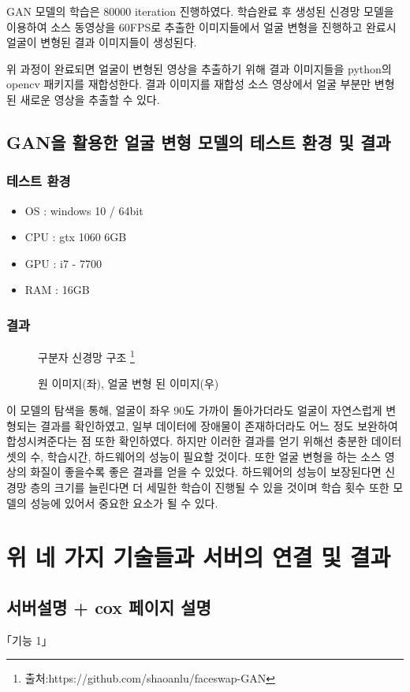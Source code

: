 \documentclass{oblivoir}
\newcommand{\spec}{
\begin{itemize}
    \item OS : windows 10 / 64bit
    \item CPU : gtx 1060 6GB
    \item GPU : i7 - 7700
    \item RAM : 16GB
\end{itemize}
}
\begin{document}
\begin{enumerate}
    GAN 모델의 학습은 80000 iteration 진행하였다. 학습완료 후 생성된 신경망 모델을 이용하여 소스 동영상을 60FPS로 추출한 이미지들에서 얼굴 변형을 진행하고 완료시 얼굴이 변형된 결과 이미지들이 생성된다.

    위 과정이 완료되면 얼굴이 변형된 영상을 추출하기 위해 결과 이미지들을 python의 opencv 패키지를 재합성한다. 결과 이미지를 재합성 소스 영상에서 얼굴 부분만 변형된 새로운 영상을 추출할 수 있다.

    \section{ GAN을 활용한 얼굴 변형 모델의 테스트 환경 및 결과}

    \subsection{테스트 환경}
    \spec
    \subsection{결과}

    \begin{figure}[h!]
    \centering
    \caption{구분자 신경망 구조 \protect\footnote{출처:https://github.com/shaoanlu/faceswap-GAN}}
    \end{figure}

    \begin{figure}[h!]
    \centering
    \caption{원 이미지(좌), 얼굴 변형 된 이미지(우)}
    \end{figure}


    이 모델의 탐색을 통해, 얼굴이 좌우 90도 가까이 돌아가더라도 얼굴이 자연스럽게 변형되는 결과를 확인하였고, 일부 데이터에 장애물이 존재하더라도 어느 정도 보완하여 합성시켜준다는 점 또한 확인하였다. 하지만 이러한 결과를 얻기 위해선 충분한 데이터 셋의 수, 학습시간, 하드웨어의 성능이 필요할 것이다. 또한 얼굴 변형을 하는 소스 영상의 화질이 좋을수록 좋은 결과를 얻을 수 있었다. 하드웨어의 성능이 보장된다면 신경망 층의 크기를 늘린다면 더 세밀한 학습이 진행될 수 있을 것이며 학습 횟수 또한 모델의 성능에 있어서 중요한 요소가 될 수 있다.

    \chapter{ 위 네 가지 기술들과 서버의 연결 및 결과  }

    \section{ 서버설명 + cox 페이지 설명}

    \begin{figure}[h!]
    \centering
    \end{figure}

    \begin{figure}[h!]
    \centering
    \end{figure}
\end{enumerate}
｢기능 1｣
\end{document}
